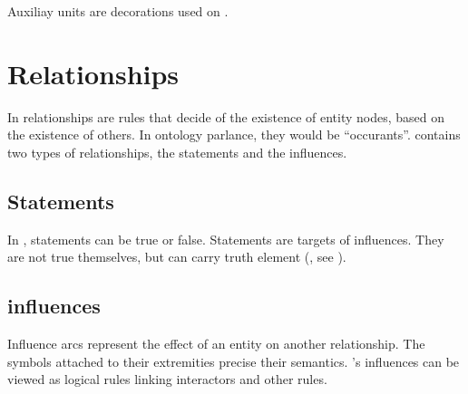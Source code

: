 Auxiliay units are decorations used on .






\section{Relationships}\label{sec:relationships}

In \SBGNERLone{} relationships are rules that decide of the existence of entity nodes, based on the existence of others. In ontology parlance, they would be ``occurants''. \SBGNERLone{} contains two types of relationships, the statements and the influences.


\subsection{Statements}\label{sec:statements}

In \SBGNERLone{}, statements can be true or false. Statements are targets of influences. They are not true themselves, but can carry truth element (, see ). 





\subsection{influences}\label{sec:influences}

Influence arcs represent the effect of an entity on another relationship. The symbols attached to their extremities precise their semantics. \SBGNERLone's influences can be viewed as logical rules linking interactors and other rules.








